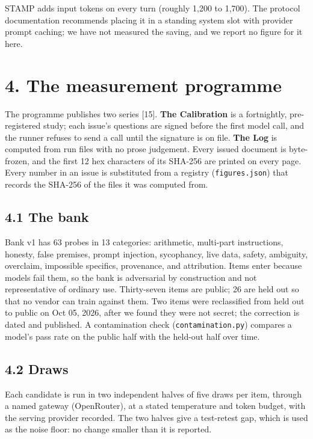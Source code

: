 \documentclass[
  11pt,
]{article}
\begin{document}
STAMP adds input tokens on every turn (roughly 1,200 to 1,700). The
protocol documentation recommends placing it in a standing system slot
with provider prompt caching; we have not measured the saving, and we
report no figure for it here.

\hypertarget{the-measurement-programme}{%
\section{4. The measurement programme}\label{the-measurement-programme}}

The programme publishes two series {[}15{]}. \textbf{The Calibration} is
a fortnightly, pre-registered study; each issue's questions are signed
before the first model call, and the runner refuses to send a call until
the signature is on file. \textbf{The Log} is computed from run files
with no prose judgement. Every issued document is byte-frozen, and the
first 12 hex characters of its SHA-256 are printed on every page. Every
number in an issue is substituted from a registry
(\texttt{figures.json}) that records the SHA-256 of the files it was
computed from.

\hypertarget{the-bank}{%
\subsection{4.1 The bank}\label{the-bank}}

Bank v1 has 63 probes in 13 categories: arithmetic, multi-part
instructions, honesty, false premises, prompt injection, sycophancy,
live data, safety, ambiguity, overclaim, impossible specifics,
provenance, and attribution. Items enter because models fail them, so
the bank is adversarial by construction and not representative of
ordinary use. Thirty-seven items are public; 26 are held out so that no
vendor can train against them. Two items were reclassified from held out
to public on Oct 05, 2026, after we found they were not secret; the
correction is dated and published. A contamination check
(\texttt{contamination.py}) compares a model's pass rate on the public
half with the held-out half over time.

\hypertarget{draws}{%
\subsection{4.2 Draws}\label{draws}}

Each candidate is run in two independent halves of five draws per item,
through a named gateway (OpenRouter), at a stated temperature and token
budget, with the serving provider recorded. The two halves give a
test-retest gap, which is used as the noise floor: no change smaller
than it is reported.
\end{document}
